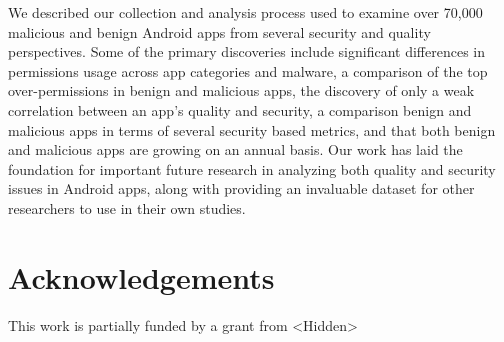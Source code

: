 \documentclass{sig-alternate-05-2015}
\begin{document}
We described our collection and analysis process used to examine over 70,000 malicious and benign Android apps from several security and quality perspectives. Some of the primary discoveries include significant differences in permissions usage across app categories and malware, a comparison of the top over-permissions in benign and malicious apps, the discovery of only a weak correlation between an app's quality and security, a comparison benign and malicious apps in terms of several security based metrics, and that both benign and malicious apps are growing on an annual basis. Our work has laid the foundation for important future research in analyzing both quality and security issues in Android apps, along with providing an invaluable dataset for other researchers to use in their own studies.



\section*{Acknowledgements}

This work is partially funded by a grant from  <Hidden>



\balance


\end{document}
